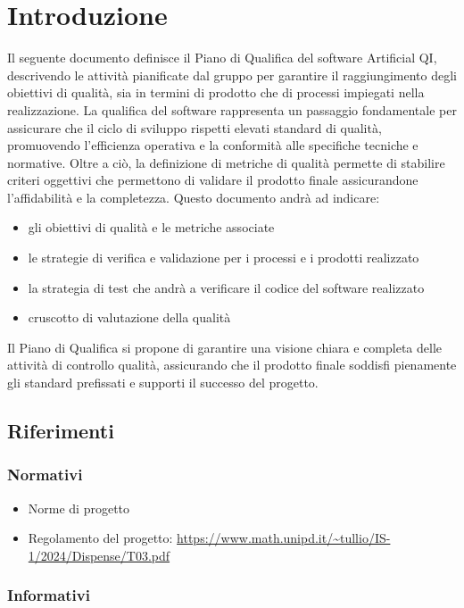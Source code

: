 \section{Introduzione}
\label{sec:introduzione_pq}
Il seguente documento definisce il Piano di Qualifica del software Artificial QI, descrivendo le attività  pianificate dal gruppo
per garantire il raggiungimento degli obiettivi di qualità, sia in termini di prodotto che di processi impiegati nella realizzazione.
La qualifica del software rappresenta un passaggio fondamentale per assicurare che il ciclo di sviluppo rispetti elevati standard di qualità, 
promuovendo l'efficienza operativa e la conformità alle specifiche tecniche e normative.
Oltre a ciò, la definizione di metriche di qualità permette di stabilire criteri oggettivi che permettono di validare il prodotto finale 
assicurandone l'affidabilità e la completezza.
Questo documento andrà ad indicare:
\begin{itemize}
    \item gli obiettivi di qualità e le metriche associate
    \item le strategie di verifica e validazione per i processi e i prodotti realizzato
    \item la strategia di test che andrà a verificare il codice del software realizzato
    \item cruscotto di valutazione della qualità
\end{itemize}
Il Piano di Qualifica si propone di garantire una visione chiara e completa delle attività di controllo qualità, 
assicurando che il prodotto finale soddisfi pienamente gli standard prefissati e supporti il successo del progetto.
\subsection{Riferimenti}
\subsubsection{Normativi}
\begin{itemize}
    \item Norme di progetto
    \item Regolamento del progetto: \url{https://www.math.unipd.it/~tullio/IS-1/2024/Dispense/T03.pdf}
\end{itemize}
\subsubsection{Informativi}


